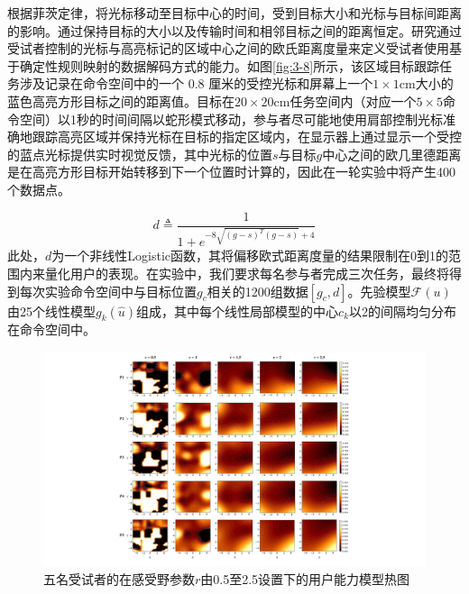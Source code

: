 根据菲茨定律\cite{tangFittsLawModulated2018}，将光标移动至目标中心的时间，受到目标大小和光标与目标间距离的影响。通过保持目标的大小以及传输时间和相邻目标之间的距离恒定。研究通过受试者控制的光标与高亮标记的区域中心之间的欧氏距离度量来定义受试者使用基于确定性规则映射的数据解码方式的能力。如图\ref{fig:3-8}所示，该区域目标跟踪任务涉及记录在命令空间中的一个 0.8 厘米的受控光标和屏幕上一个$1\times1$cm大小的蓝色高亮方形目标之间的距离值。目标在$20\times20$cm任务空间内（对应一个$5\times5$命令空间）以1秒的时间间隔以蛇形模式移动，参与者尽可能地使用肩部控制光标准确地跟踪高亮区域并保持光标在目标的指定区域内，在显示器上通过显示一个受控的蓝点光标提供实时视觉反馈，其中光标的位置$s$与目标$g$中心之间的欧几里德距离是在高亮方形目标开始转移到下一个位置时计算的，因此在一轮实验中将产生400个数据点。

\begin{equation}
    \label{ex12}
    d \triangleq \frac{1}{1+e^{-8\sqrt{(g-s)^T(g-s)}+4}} 
\end{equation}    
此处，$d$为一个非线性Logistic函数，其将偏移欧式距离度量的结果限制在0到1的范围内来量化用户的表现。在实验中，我们要求每名参与者完成三次任务，最终将得到每次实验命令空间中与目标位置$g_c$相关的1200组数据$[g_c,d]$。先验模型$\mathcal{F}(u)$由25个线性模型$g_k(\hat u)$组成，其中每个线性局部模型的中心$c_k$以2的间隔均匀分布在命令空间中。
\begin{figure}[htb]
    \includegraphics[width=1\textwidth]{figures/3-Fig-9.pdf}
    \caption{五名受试者的在感受野参数$r$由0.5至2.5设置下的用户能力模型热图}
    \label{fig:3-9}
\end{figure}  

